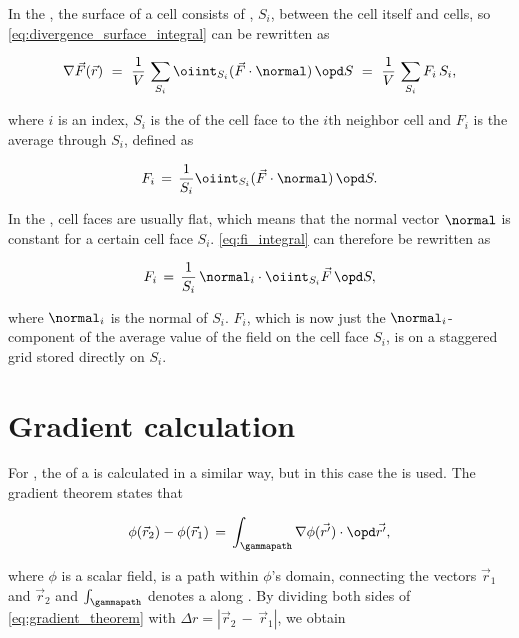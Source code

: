 In the \FVM, the surface of a cell consists of , $S_i$, between the cell itself and \neighboring cells, so \eqref{eq:divergence_surface_integral} can be rewritten as

\begin{equation} \label{eq:divergence_cell_face_sum}
\nabla\vec{F}(\vec{r})\ =\ \frac{1}{V}\,\sum_{S_i} \oiint_{S_i}(\vec{F}\cdot\normal)\,\opd S\ =\ \frac{1}{V}\,\sum_{S_i} F_i\,S_i,
\end{equation}

where $i$ is an index, $S_i$ is the \area of the cell face to the $i$th neighbor cell and $F_i$ is the average  through $S_i$, defined as

\begin{equation} \label{eq:fi_integral}
F_i \,=\, \frac{1}{S_i}\oiint_{S_i}(\vec{F}\cdot\normal)\,\opd S.
\end{equation}

In the \FVM, cell faces are usually flat, which means that the normal vector $\normal$ is constant for a certain cell face $S_i$. \eqref{eq:fi_integral} can therefore be rewritten as

\begin{equation} \label{eq:fi_flat_cell_face}
F_i \,=\, \frac{1}{S_i}\,\normal_i\cdot\oiint_{S_i}\vec{F}\,\opd S,
\end{equation}

where $\normal_i$ is the normal of $S_i$. $F_i$, which is now just the $\normal_i$-component of the average value of the field on the cell face $S_i$, is on a staggered grid stored directly on $S_i$.

\section{Gradient calculation}

For , the \gradient of a  is calculated in a similar way, but in this case the  is used. The gradient theorem states that

\begin{equation} \label{eq:gradient_theorem}
\phi(\vec{r}_2)-\phi(\vec{r}_1) \,=\, \int_\gammapath\nabla\phi(\vec{r'})\cdot \opd\vec{r'},
\end{equation}

where $\phi$ is a scalar field, \textgammapath is a path within $\phi$'s domain, connecting the vectors $\vec{r}_1$ and $\vec{r}_2$ and $\int_\gammapath$ denotes a  along \textgammapath. By dividing both sides of \eqref{eq:gradient_theorem} with \mbox{$\Delta r = |\vec{r}_2\,-\,\vec{r}_1|$}, we obtain


